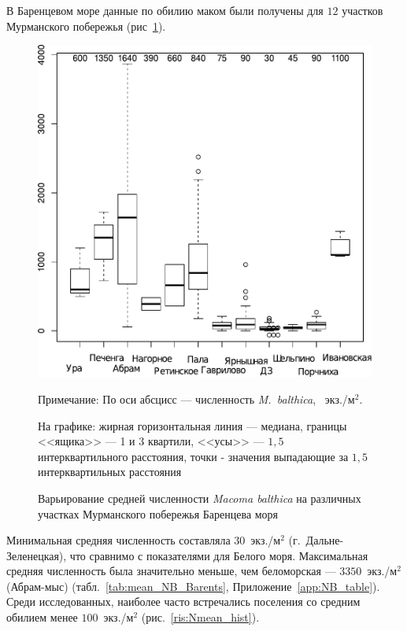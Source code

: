 В Баренцевом море данные по обилию маком были получены для $12$ участков Мурманского побережья (рис~\ref{ris:N_area_Barents}).
	\begin{figure}[p]
	\begin{center}
		\includegraphics[height=0.5\textheight]{../All_N/N2_area_Barents1.pdf}
	\end{center}
	\caption{Варьирование средней численности {\it Macoma balthica} на различных участках Мурманского побережья Баренцева моря}
	{\footnotesize Примечание: По оси абсцисс --- численность {\it M.~balthica}, ~экз./м$^2$.

	На графике: жирная горизонтальная линия --- медиана, границы <<ящика>> --- 1 и 3 квартили, <<усы>> --- $1,5$ интерквартильного расстояния, точки - значения выпадающие за $1,5$ интерквартильных расстояния}
	\label{ris:N_area_Barents}
	\end{figure}
Минимальная средняя численность составляла $30$~экз./м$^2$ (г.~Дальне-Зеленецкая), что сравнимо с показателями для Белого моря. 
Максимальная средняя численность была значительно меньше, чем беломорская --- $3350$~экз./м$^2$ (Абрам-мыс) (табл.~\ref{tab:mean_NB_Barents}, Приложение~\ref{app:NB_table}). 
Среди исследованных, наиболее часто встречались поселения со средним обилием менее $100$~экз./м$^2$ (рис.~\ref{ris:Nmean_hist}).

